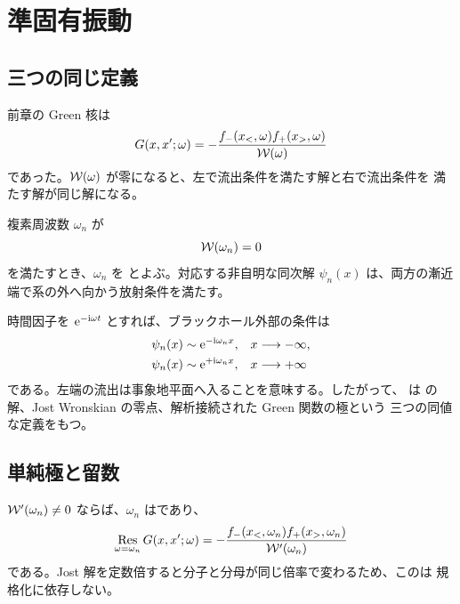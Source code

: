 \chapter{準固有振動}
\label{chap:qnm}

\section{三つの同じ定義}

前章の Green 核は
\begin{equation}
G(x,x';\omega)
=
-\frac{f_-(x_<,\omega)f_+(x_>,\omega)}{\mathcal{W}(\omega)}
\label{eq:qnm-start-green}
\end{equation}
であった。$\mathcal{W}(\omega)$ が零になると、左で流出条件を満たす解と右で流出条件を
満たす解が同じ解になる。

\begin{definition}[準固有振動]
複素周波数 $\omega_n$ が
\begin{equation}
\mathcal{W}(\omega_n)=0
\label{eq:qnm_wronskian_zero}
\end{equation}
を満たすとき、$\omega_n$ を とよぶ。対応する非自明な同次解
$\psi_n(x)$ は、両方の漸近端で系の外へ向かう放射条件を満たす。
\end{definition}

時間因子を $\mathrm{e}^{-\mathrm{i}\omega t}$ とすれば、ブラックホール外部の条件は
\begin{align}
\psi_n(x)
&\sim
\mathrm{e}^{-\mathrm{i}\omega_n x},
&&x\longrightarrow-\infty,
\label{eq:qnm_bc_left}
\\
\psi_n(x)
&\sim
\mathrm{e}^{+\mathrm{i}\omega_n x},
&&x\longrightarrow+\infty
\label{eq:qnm_bc_right}
\end{align}
である。左端の流出は事象地平面へ入ることを意味する。したがって、 は
の解、Jost Wronskian の零点、解析接続された Green 関数の極という
三つの同値な定義をもつ。

\section{単純極と留数}

$\mathcal{W}'(\omega_n)\ne0$ ならば、$\omega_n$ はであり、
\begin{equation}
\mathop{\mathrm{Res}}_{\omega=\omega_n}
G(x,x';\omega)
=
-\frac{
f_-(x_<,\omega_n)f_+(x_>,\omega_n)
}{
\mathcal{W}'(\omega_n)
}
\label{eq:qnm_green_residue}
\end{equation}
である。Jost 解を定数倍すると分子と分母が同じ倍率で変わるため、このは
規格化に依存しない。


